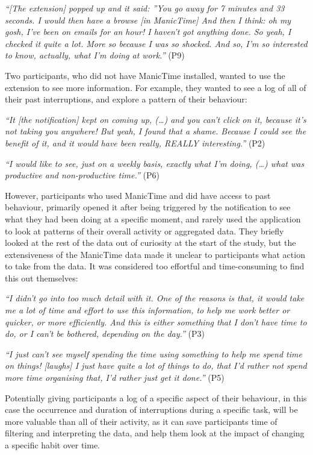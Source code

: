 \textit{“[The extension] popped up and it said: ”You go away for 7 minutes and 33 seconds. I would then have a browse [in ManicTime] And then I think: oh my gosh, I've been on emails for an hour! I haven't got anything done. So yeah, I checked it quite a lot. More so because I was so shocked. And so, I'm so interested to know, actually, what I'm doing at work.”} (P9)

Two participants, who did not have ManicTime installed, wanted to use the extension to see more information. For example, they wanted to see a log of all of their past interruptions, and explore a pattern of their behaviour:

\textit{“It [the notification] kept on coming up, (…) and you can't click on it, because it's not taking you anywhere! But yeah, I found that a shame. Because I could see the benefit of it, and it would have been really, REALLY interesting.”} (P2)

\textit{“I would like to see, just on a weekly basis, exactly what I’m doing, (…)  what was productive and non-productive time.”} (P6)

However, participants who used ManicTime and did have access to past behaviour, primarily opened it after being triggered by the notification to see what they had been doing at a specific moment, and rarely used the application to look at patterns of their overall activity or aggregated data. They briefly looked at the rest of the data out of curiosity at the start of the study, but the extensiveness of the ManicTime data made it unclear to participants what action to take from the data. It was considered too effortful and time-consuming to find this out themselves:

\textit{“I didn’t go into too much detail with it. One of the reasons is that, it would take me a lot of time and effort to use this information, to help me work better or quicker, or more efficiently. And this is either something that I don’t have time to do, or I can’t be bothered, depending on the day.”} (P3)

\textit{“I just can't see myself spending the time using something to help me spend time on things! [laughs] I just have quite a lot of things to do, that I’d rather not spend more time organising that, I’d rather just get it done.”} (P5)

Potentially giving participants a log of a specific aspect of their behaviour, in this case the occurrence and duration of interruptions during a specific task, will be more valuable than all of their activity, as it can save participants time of filtering and interpreting the data, and help them look at the impact of changing a specific habit over time. 

